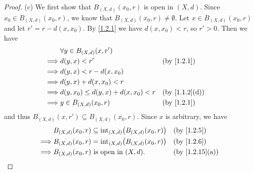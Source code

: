 \begin{proof}{(c)}
  We first show that \(B_{(X, d)}(x_0, r)\) is open in \((X, d)\).
  Since \(x_0 \in B_{(X, d)}(x_0, r)\), we know that \(B_{(X, d)}(x_0, r) \neq \emptyset\).
  Let \(x \in B_{(X, d)}(x_0, r)\) and let \(r' = r - d(x, x_0)\).
  By \cref{1.2.1} we have \(d(x, x_0) < r\), so \(r' > 0\).
  Then we have
  \begin{align*}
             & \forall y \in B_{(X, d)}(x, r')                                         \\
    \implies & d(y, x) < r'                           &  & \text{(by \cref{1.2.1})}    \\
    \implies & d(y, x) < r - d(x, x_0)                                                 \\
    \implies & d(y, x) + d(x, x_0) < r                                                 \\
    \implies & d(y, x_0) \leq d(y, x) + d(x, x_0) < r &  & \text{(by \cref{1.1.2}(d))} \\
    \implies & y \in B_{(X, d)}(x_0, r)               &  & \text{(by \cref{1.2.1})}
  \end{align*}
  and thus \(B_{(X, d)}(x, r') \subseteq B_{(X, d)}(x_0, r)\).
  Since \(x\) is arbitrary, we have
  \begin{align*}
             & B_{(X, d)}(x_0, r) \subseteq \text{int}_{(X, d)}\big(B_{(X, d)}(x_0, r)\big) &  & \text{(by \cref{1.2.5})}     \\
    \implies & B_{(X, d)}(x_0, r) = \text{int}_{(X, d)}\big(B_{(X, d)}(x_0, r)\big)         &  & \text{(by \cref{1.2.6})}     \\
    \implies & B_{(X, d)}(x_0, r) \text{ is open in } (X, d).                               &  & \text{(by \cref{1.2.15}(a))}
  \end{align*}


\end{proof}
